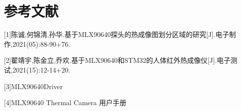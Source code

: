 \section*{参考文献}
[1]陈诚,何锦清,孙华.基于MLX90640探头的热成像图划分区域的研究[J].电子制作,2021(05):88-90+76.

[2]翟靖宇,陈金立,乔欢.基于MLX90640和STM32的人体红外热成像仪[J].电子测试,2021(15):12-14+20.

[3]MLX90640Driver

[4]MLX90640 Thermal Camera 用户手册



